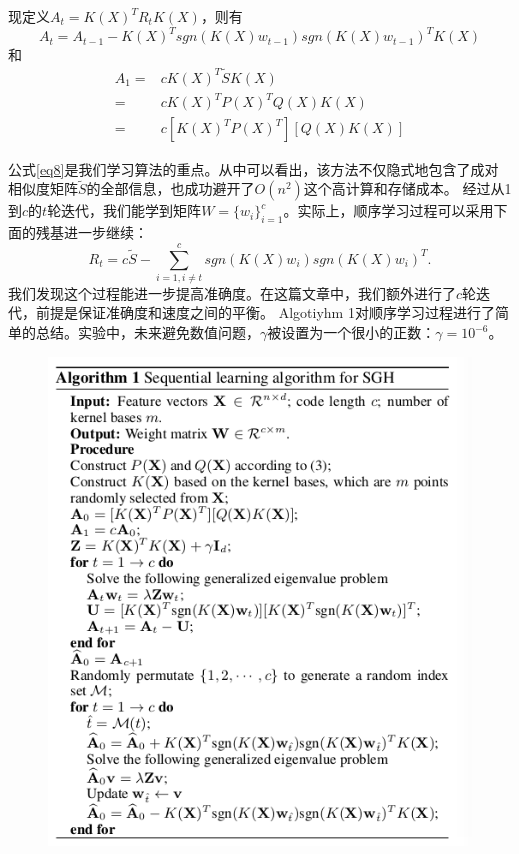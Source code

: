 \message{ !name(SGH.tex)}\documentclass[prodmode,acmtecs]{acmsmall}
\begin{document}
现定义$A_t=K(X)^TR_tK(X)$，则有
\begin{equation*}
A_t = A_{t-1}-K(X)^Tsgn(K(X)w_{t-1})sgn(K(X)w_{t-1})^TK(X)
\end{equation*}
和
\begin{equation}
\begin{split}
A_1=&cK(X)^T\tilde{S}K(X)\\
   =&cK(X)^TP(X)^TQ(X)K(X)\\    
   =&c[K(X)^TP(X)^T][Q(X)K(X)]
\label{eq8}
\end{split}
\end{equation}

公式\ref{eq8}是我们学习算法的重点。从中可以看出，该方法不仅隐式地包含了成对相似度矩阵$\tilde{S}$的全部信息，也成功避开了$O(n^2)$这个高计算和存储成本。
经过从1到$c$的$t$轮迭代，我们能学到矩阵$W=\{w_i\}^c_{i=1}$。实际上，顺序学习过程可以采用下面的残基进一步继续：
\begin{equation*}
R_t=c\tilde{S}-\sum^c_{i=1,i\neq t}sgn(K(X)w_i)sgn(K(X)w_i)^T.
\end{equation*}
我们发现这个过程能进一步提高准确度。在这篇文章中，我们额外进行了$c$轮迭代，前提是保证准确度和速度之间的平衡。
Algotiyhm 1对顺序学习过程进行了简单的总结。实验中，未来避免数值问题，$\gamma$被设置为一个很小的正数：$\gamma =10^{-6}$。

\begin{figure}[htbp]%
\centering
\includegraphics[width=0.5\paperwidth]{alg.png}
\label{fig:alg}
\end{figure}
\end{document}
